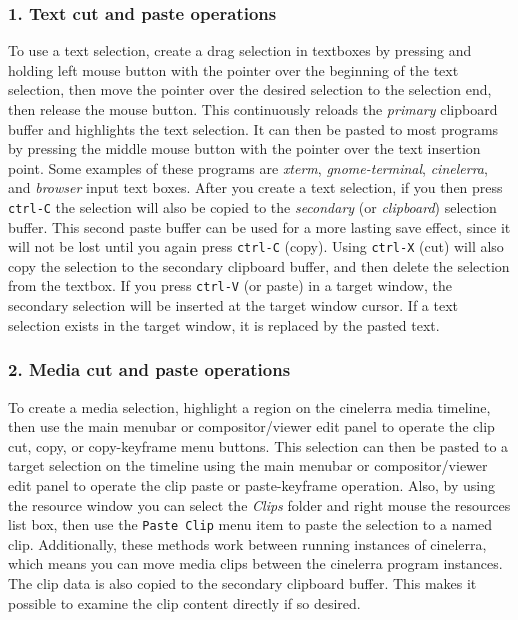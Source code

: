 \subsubsection*{1. Text cut and paste operations}%
\label{ssub:text_cut_paste_operations}

To use a text selection, create a drag selection in textboxes by pressing and holding left mouse button with the pointer over the beginning of the text selection, then move the pointer over the desired selection to the selection end, then release the mouse button.  This continuously reloads the \textit{primary} clipboard buffer and highlights the text selection.  It can then be pasted to most programs by pressing the middle mouse button with the pointer over the text insertion point.  Some examples of these programs are \textit{xterm}, \textit{gnome-terminal}, \textit{cinelerra}, and \textit{browser} input text boxes.  After you create a text selection, if you then press \texttt{ctrl-C} the selection will also be copied to the \textit{secondary} (or \textit{clipboard}) selection buffer.  This second paste buffer can be used for a more lasting save effect, since it will not be lost until you again press \texttt{ctrl-C} (copy).  Using \texttt{ctrl-X} (cut) will also copy the selection to the secondary clipboard buffer, and then delete the selection from the textbox.  If you press \texttt{ctrl-V} (or paste) in a target window, the secondary selection will be inserted at the target window cursor.  If a text selection exists in the target window, it is replaced by the pasted text.

\subsubsection*{2. Media cut and paste operations}%
\label{ssub:media_cut_paste_operations}

To create a media selection, highlight a region on the cinelerra media timeline, then use the main menubar or compositor/viewer edit panel to operate the clip cut, copy, or copy-keyframe menu buttons.  This selection can then be pasted to a target selection on the timeline using the main menubar or compositor/viewer edit panel to operate the clip paste or paste-keyframe operation.  Also, by using the resource window you can select the \textit{Clips} folder and right mouse the resources list box, then use the \texttt{Paste Clip} menu item to paste the selection to a named clip.  Additionally, these methods work between running instances of cinelerra, which means you can move media clips between the cinelerra program instances.  The clip data is also copied to the secondary clipboard buffer.  This makes it possible to examine the clip content directly if so desired.

